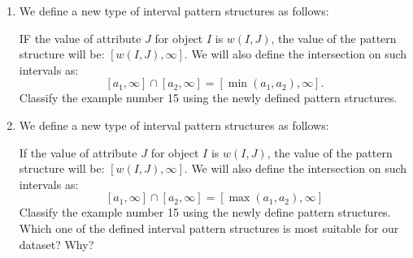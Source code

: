 \documentclass[12pt]{report}
\begin{document}
\begin{problem}{}
\begin{enumerate}
    \item We define a new type of interval pattern structures as follows:
    \par 
    IF the value of attribute $J$ for object $I$ is $w(I, J)$, the value of the pattern structure will be: $[w(I, J), \infty]$. We will also define the intersection on such intervals as:
    \[
        [a_1, \infty] \cap [a_2, \infty] = [\min (a_1, a_2), \infty].  
    \]
    Classify the example number 15 using the newly defined pattern structures.
    \item We define a new type of interval pattern structures as follows:
    \par 
    If the value of attribute $J$ for object $I$ is $w(I, J)$, the value of the pattern structure will be: $[w(I,J), \infty]$. We will also define the intersection on such intervals as:
    \[
        [a_1, \infty] \cap [a_2, \infty] = [\max (a_1, a_2), \infty]  
    \]
    Classify the example number 15 using the newly define pattern structures. Which one of the defined interval pattern structures is most suitable for our dataset? Why?
    \end{enumerate}
\end{problem}
\end{document}
